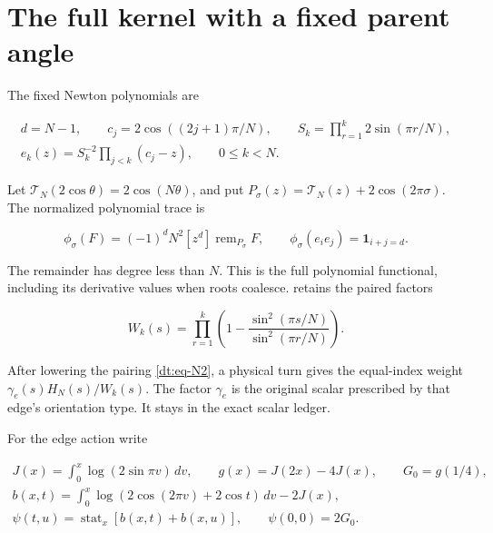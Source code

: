 \section{The full kernel with a fixed parent angle}\label{dt:sec-2}

The fixed Newton polynomials are

\begin{equation}\label{dt:eq-N1}
\begin{gathered}
 d=N-1,\qquad c_j=2\cos((2j+1)\pi/N),\qquad
 S_k=\prod_{r=1}^k2\sin(\pi r/N),\\
 e_k(z)=S_k^{-2}\prod_{j<k}(c_j-z),\qquad 0\le k<N.
 \end{gathered}
\end{equation}

Let \(\mathcal T_N(2\cos\theta)=2\cos(N\theta)\), and put
\(P_\sigma(z)=\mathcal T_N(z)+2\cos(2\pi\sigma)\). The normalized
polynomial trace is

\begin{equation}\label{dt:eq-N2}
\phi_\sigma(F)=(-1)^dN^2[z^d]\operatorname{rem}_{P_\sigma}F,
 \qquad \phi_\sigma(e_i e_j)=\mathbf1_{i+j=d}.
\end{equation}

The remainder has degree less than \(N\). This is the full polynomial
functional, including its derivative values when roots coalesce.
\cite[Theorem~7.1]{Meridian}
retains the paired factors

\begin{equation}\label{dt:eq-N3}
W_k(s)=\prod_{r=1}^k
     \left(1-\frac{\sin^2(\pi s/N)}{\sin^2(\pi r/N)}\right).
\end{equation}

After lowering the pairing \eqref{dt:eq-N2}, a physical turn gives the equal-index
weight \(\gamma_e(s)H_N(s)/W_k(s)\). The factor \(\gamma_e\) is the
original scalar prescribed by that edge's orientation type. It stays in
the exact scalar ledger.

For the edge action write

\begin{equation}\label{dt:eq-N4}
\begin{gathered}
 J(x)=\int_0^x\log(2\sin\pi v)\,dv,\qquad
 g(x)=J(2x)-4J(x),\qquad G_0=g(1/4),\\
 b(x,t)=\int_0^x\log(2\cos(2\pi v)+2\cos t)\,dv-2J(x),\\
 \psi(t,u)=\operatorname{stat}_x[b(x,t)+b(x,u)],
                       \qquad\psi(0,0)=2G_0.
 \end{gathered}
\end{equation}


